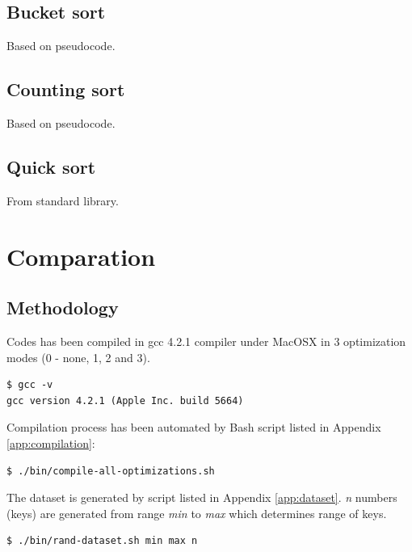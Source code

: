 \documentclass[12pt]{article}
\begin{document}
\subsection{Bucket sort}

Based on pseudocode\cite{czech}.



\subsection{Counting sort}

Based on pseudocode\cite{czech}.



\subsection{Quick sort}

From standard library.



\section{Comparation}

\subsection{Methodology}

Codes has been compiled in gcc 4.2.1 compiler under MacOSX in 3 optimization modes (0 - none, 1, 2 and 3)\cite{man-gcc}.

\begin{lstlisting}
$ gcc -v
gcc version 4.2.1 (Apple Inc. build 5664)
\end{lstlisting}

Compilation process has been automated by Bash script listed in Appendix \ref{app:compilation}:

\begin{lstlisting}
$ ./bin/compile-all-optimizations.sh
\end{lstlisting}

The dataset is generated by script listed in Appendix \ref{app:dataset}. \emph{n} numbers (keys) are generated from range \emph{min} to \emph{max} which determines range of keys.

\begin{lstlisting}
$ ./bin/rand-dataset.sh min max n
\end{lstlisting}
\end{document}
